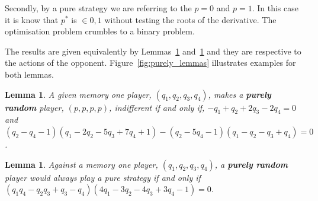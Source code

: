 \documentclass[10pt]{article}
\newtheorem{lemma}[theorem]{Lemma}
\begin{document}
Secondly, by a pure strategy we are referring to the \(p=0\) and \(p=1\).
In this case it is know that \(p^*\) is \(\in {0, 1}\) without testing the roots
of the derivative. The optimisation problem crumbles to a binary problem.

The results are given equivalently by Lemmas~\ref{lemma:constant} and~\ref{lemma:linear}
and they are respective to the actions of the opponent. Figure~\ref{fig:purely_lemmas}
illustrates examples for both lemmas.

\begin{lemma}\label{lemma:constant}
    A given memory one player, \((q_1, q_2, q_3, q_4)\), makes a \textbf{purely
    random} player, \((p, p, p, p)\), indifferent if and only if, 
    \(-q_1 + q_2 + 2q_3 - 2q_4 = 0 \) and 
    \((q_2 - q_4 - 1)(q_1 - 2q_2 - 5q_3 + 7q_4 + 1) -(q_2 - 5q_4 - 1)(q_1 - q_2 - q_3 + q_4) = 0 \).
\end{lemma}

\begin{lemma}\label{lemma:linear}
    Against a memory one player, \((q_1, q_2, q_3, q_4)\), a \textbf{purely random}
    player would always play a pure strategy if and only if
    \((q_{1}q_{4} - q_{2} q_{3} + q_{3} - q_{4}) (4 q_{1} - 3 q_{2} - 4 q_{3} + 3 
    q_{4} - 1) = 0\).
\end{lemma}
\end{document}
